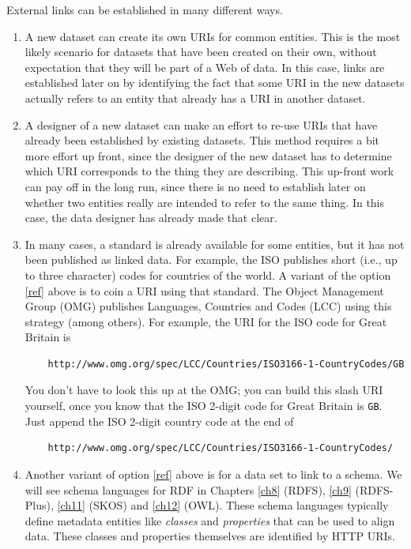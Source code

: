 External links can be established in many different ways.
\begin{enumerate}
    \item A new dataset can create its own URIs for common entities.  This is 
    the most likely scenario for datasets that have been created on their own, without
    expectation that they will be part of a Web of data.  In this case, links
    are established later on by identifying the fact that some URI in the new datasets
    actually refers to an entity that already has a URI in another dataset.  
    
    \item{A designer of a new dataset can make an effort to re-use URIs that have already been established by 
    existing datasets.  This method requires a bit more effort up front, since the designer of the new 
    dataset has to determine which URI corresponds to the thing they are describing. This up-front 
    work can pay off in the long run,  since
    there is no need to establish later on whether two entities really are intended to refer to the same thing. 
    In this case, the data designer has already made that clear.  
    \label{ref}
    }
    
    \item In many cases, a standard is already available for some entities, but it has not been published as 
    linked data.  For example, the ISO publishes short (i.e., up to three character) codes for countries of the world. 
    A variant of the  option \ref{ref} above is to coin a URI using that standard.  The Object Management Group (OMG) publishes Languages, Countries and Codes (LCC) using this strategy (among others).  For example, the URI for the ISO code for Great Britain is 
    \begin{lstlisting}
    http://www.omg.org/spec/LCC/Countries/ISO3166-1-CountryCodes/GB
    \end{lstlisting}
    You don't have to look this up 
    at the OMG; you can build this slash URI yourself, once you know that the ISO 2-digit code for Great Britain is \texttt{GB}. Just append the ISO 2-digit country code at the end of 
    \begin{lstlisting}
    http://www.omg.org/spec/LCC/Countries/ISO3166-1-CountryCodes/
    \end{lstlisting}
    
    \item Another variant of option \ref{ref} above is for a data set to link to a schema.  We will see schema languages for RDF in Chapters \ref{ch8} (RDFS), \ref{ch9} (RDFS-Plus), \ref{ch11} (SKOS) and \ref{ch12} (OWL).  These schema languages typically define metadata entities like \emph{classes} and \emph{properties} that can be used to align data.  These classes and properties themselves are identified by HTTP URIs.   \label{schem}
\end{enumerate}

